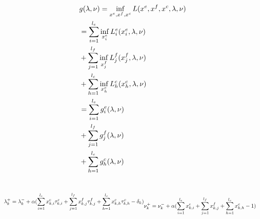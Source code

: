 \documentclass[conference]{IEEEtran}
\begin{document}
    \begin{subequations}
      \begin{align}
        &g(\lambda, \nu) = \inf_{x^e,x^f,x^c}L(x^e,x^f,x^c,\lambda,\nu) \\ \notag
        &=\sum_{i=1}^{l_e}\inf_{x_i^e}L_{i}^e(x_{i}^e,\lambda,\nu) \\ \notag
        &+\sum_{j=1}^{l_f}\inf_{x_j^f}L_{j}^f(x_{j}^f,\lambda,\nu) \\ \notag
        &+\sum_{h=1}^{l_c}\inf_{x_h^c}L_{h}^c(x_{h}^c,\lambda,\nu) \\ \notag
        &=\sum_{i=1}^{l_e}g_{i}^e(\lambda,\nu) \\ \notag
        &+\sum_{j=1}^{l_f}g_{j}^f(\lambda,\nu) \\ \notag
        &+\sum_{h=1}^{l_c}g_{h}^c(\lambda,\nu) \\ \notag
      \end{align}
    \end{subequations}

    \begin{subequations}
      \begin{align}
        &\lambda_k^+ = \lambda_k^- + \alpha(\sum_{i=1}^{l_e}x_{k,i}^e\tau_{k,i}^e
        +\sum_{j=1}^{l_f}x_{k,j}^f\tau_{k,j}^f
        +\sum_{h=1}^{l_c}x_{k,h}^c\tau_{k,h}^c
        -\delta_k) \\ \notag
      \end{align}
      \begin{align}
        &\nu_k^+ = \nu_k^- + \alpha(\sum_{i=1}^{l_e}x_{k,i}^e+\sum_{j=1}^{l_f}x_{k,j}^f+\sum_{h=1}^{l_c}x_{k,h}^c-1)
      \end{align}
    \end{subequations}
\end{document}
